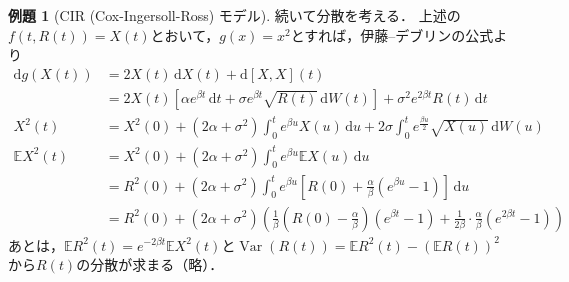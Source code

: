 \documentclass[a4paper, lualatex, ja=standard]{bxjsarticle}
\theoremstyle{definition}
\newtheorem{expl}[thm]{例題}
\newcommand{\E}{\mathbb{E}}
\newcommand{\diff}{\mathrm{d}}
\begin{document}
\begin{expl}[CIR (Cox-Ingersoll-Ross) モデル]
  続いて分散を考える．
  上述の$f(t,R(t))=X(t)$とおいて，$g(x)=x^2$とすれば，伊藤--デブリンの公式より
  \begin{align*}
    \diff g(X(t)) &= 2X(t)\,\diff X(t) + \diff [X,X](t)\\
    &= 2X(t)[\alpha e^{\beta t}\,\diff t + \sigma e^{\beta t}\sqrt{R(t)}\,\diff W(t)] + \sigma^2 e^{2\beta t}R(t)\,\diff t\\
    X^2(t) &= X^2(0) + (2\alpha+\sigma^2)\int_0^t e^{\beta u}X(u)\,\diff u + 2\sigma\int_0^t e^{\frac{\beta u}{2}}\sqrt{X(u)}\,\diff W(u)\\
    \E X^2(t) &= X^2(0) + (2\alpha+\sigma^2)\int_0^t e^{\beta u}\E X(u)\,\diff u \\
    &= R^2(0) + (2\alpha+\sigma^2)\int_0^t e^{\beta u}\left[R(0) + \frac{\alpha}{\beta}(e^{\beta u}-1)\right]\,\diff u\\
    &= R^2(0)+(2\alpha+\sigma^2)\left(\frac{1}{\beta}\left(R(0)-\frac{\alpha}{\beta}\right)(e^{\beta t}-1)+\frac{1}{2\beta}\cdot\frac{\alpha}{\beta}(e^{2\beta t}-1)\right)
  \end{align*}
  あとは，$\E R^2(t)=e^{-2\beta t}\E X^2(t)$と$\operatorname{Var}(R(t))=\E R^2(t)-(\E R(t))^2$から$R(t)$の分散が求まる（略）．
\end{expl}
\end{document}
